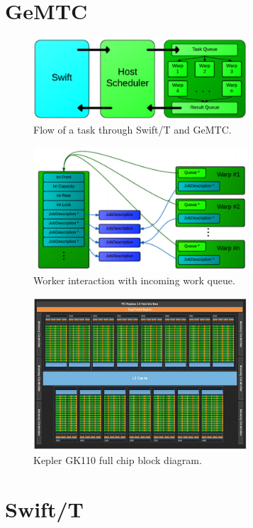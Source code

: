 \documentclass[conference]{IEEEtran}
\begin{document}
\section{GeMTC}

\begin{figure}[h]
\centering\includegraphics[width=8cm]{imgs/big_picture.png}
\caption{Flow of a task through Swift/T and GeMTC.}
\label{fig:big_pic}
\end{figure}

\begin{figure}[h]
\centering\includegraphics[width=8cm]{imgs/warps.png}
\caption{Worker interaction with incoming work queue.}
\label{fig:warps}
\end{figure}

\begin{figure}[h]
\centering\includegraphics[width=8cm]{imgs/blockdiagram.png}
\caption{Kepler GK110 full chip block diagram.}
\label{fig:block_diagram}
\end{figure}

\section{Swift/T}
\end{document}
